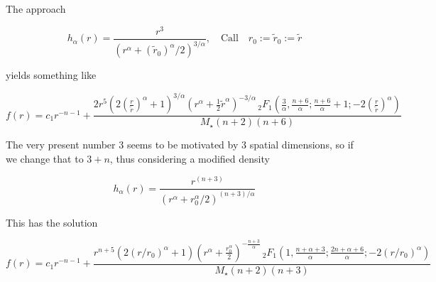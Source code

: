 \documentclass[10pt,a4paper, fleqn]{article}
\begin{document}
The approach

\begin{equation}
h_\alpha(r) = \frac{r^3}{\left( r^\alpha + (\tilde{r}_0)^\alpha / 2 \right)^{3/\alpha}}, \quad \text{Call} \quad r_0 := \tilde{r}_0 := \tilde{r}
\end{equation}

yields something like

\begin{equation}
f(r) = c_1 r^{-n-1}+\frac{2 r^5 \left(2
	\left(\frac{r}{\tilde{r}}\right)^\alpha
   +1\right)^{3/\alpha }
   \left(r^{\alpha
   }+\frac{1}{2} \tilde{r}^{\alpha
   }  \right)^{-3/\alpha } \,
   _2F_1\left(\frac{3}{\alpha
   },\frac{n+6}{\alpha
   };\frac{n+6}{\alpha }+1;-2
   \left(\frac{r}{\tilde{r}}\right)^\alpha   
   \right)}{M_\star (n+2) (n+6)}
\end{equation}

The very present number 3 seems to be motivated by 3 spatial dimensions, so if we change that to $3+n$, thus considering a modified density

\begin{equation}
h_\alpha(r) = \frac{r^{(n+3)}}{\left(r^\alpha + r_0^\alpha / 2\right)^{(n+3)/\alpha}}
\end{equation}

This has the solution

\begin{equation}
f(r) = c_1 r^{-n-1}+\frac{r^{n+5} \left(2 (r/r_0)^{\alpha }
    +1\right) \left(r^{\alpha
   }+\frac{r_0^{\alpha
   }}{2}\right)^{-\frac{n+3}{\alpha }} \,
   _2F_1\left(1,\frac{n+\alpha +3}{\alpha };\frac{2
   n+\alpha +6}{\alpha };-2 (r/r_0)^{\alpha }
   \right)}{M_\star (n+2)
   (n+3)}
\end{equation}




\end{document}
